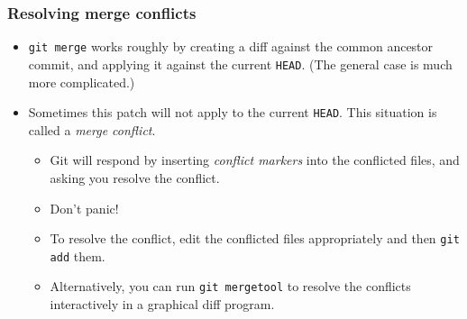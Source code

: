 \documentclass{beamer}
\begin{document}
\begin{frame}
  \frametitle{Resolving merge conflicts}

  \begin{itemize}
  \item \texttt{git merge} works roughly by creating a diff against
    the common ancestor commit, and applying it against the current
    \texttt{HEAD}.  (The general case is much more complicated.)
  \item Sometimes this patch will not apply to the current
    \texttt{HEAD}.  This situation is called a \emph{merge conflict}.
    \begin{itemize}
    \item Git will respond by inserting \emph{conflict markers} into
      the conflicted files, and asking you resolve the conflict.
    \item Don't panic!
    \item To resolve the conflict, edit the conflicted files
      appropriately and then \texttt{git add} them.
    \item Alternatively, you can run \texttt{git mergetool} to resolve
      the conflicts interactively in a graphical diff program.
    \end{itemize}
  \end{itemize}
\end{frame}
\end{document}
